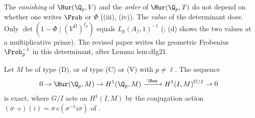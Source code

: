 \begin{warning}\label{warn:galcoh:frobenius}
The \emph{vanishing} of $\Hur(\Q_p,V)$ and the \emph{order} of $\Hur(\Q_p,T)$ do not depend on whether one writes $\Frob$ or $\Phi$ ((iii),
(iv)). The \emph{value} of the determinant does. Only $\det(1-\Phi\mid(V^D)^{I_p})$ equals $L_p(A_f,1)^{-1}$ (; (d)
shows the two values at a multiplicative prime). The revised paper writes the geometric Frobenius $\Frob_p^{-1}$ in this determinant, after Lemma lem:dfg21.
\end{warning}

\begin{proposition}\label{prop:galcoh:ur-sequence}
Let $M$ be of type (D), or of type (C) or (V) with $p\ne\ell$. The sequence
\[
0\to\Hur(\Q_p,M)\to H^1(\Q_p,M)\xrightarrow{\ \Res\ }H^1(I,M)^{G/I}\to0
\]
is exact, where $G/I$ acts on $H^1(I,M)$ by the conjugation action $(\sigma\cdot c)(i)=\sigma\,c(\sigma^{-1}i\sigma)$ of .
\end{proposition}

